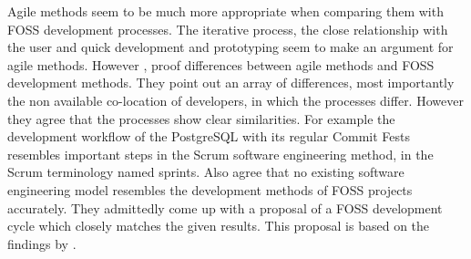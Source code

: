 Agile methods seem to be much more appropriate when comparing them with
\ac{FOSS} development processes. The iterative process, the close relationship
with the user and quick development and prototyping seem to make an argument
for agile methods. However \textcite{Koch2004}, \textcite{Warsta2003} proof
differences between agile methods and \ac{FOSS} development methods. They point
out an array of differences, most importantly the non available co-location of
developers, in which the processes differ. However they agree that the
processes show clear similarities. For example the development workflow of the
PostgreSQL with its regular Commit Fests resembles important steps in the Scrum
software engineering method, in the Scrum terminology named sprints. Also
\textcite{Roets2007} agree that no existing software engineering model
resembles the development methods of \ac{FOSS} projects accurately. They
admittedly come up with a proposal of a \ac{FOSS} development cycle which
closely matches the given results. This proposal is based on the findings by
\textcite{Jorgensen2001}.



